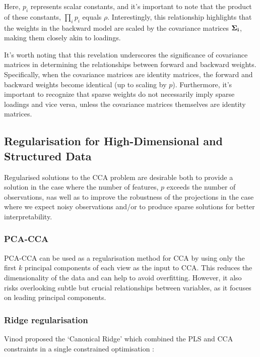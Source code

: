 Here, $p_i$ represents scalar constants, and it's important to note that the product of these constants, $\prod_i p_i$ equals $\rho$.
Interestingly, this relationship highlights that the weights in the backward model are scaled by the covariance matrices $\bold{\Sigma_i}$, making them closely akin to loadings.

It's worth noting that this revelation underscores the significance of covariance matrices in determining the relationships between forward and backward weights.
Specifically, when the covariance matrices are identity matrices, the forward and backward weights become identical (up to scaling by $p$).
Furthermore, it's important to recognize that sparse weights do not necessarily imply sparse loadings and vice versa, unless the covariance matrices themselves are identity matrices.

\subsection{Regularisation for High-Dimensional and Structured Data}

Regularised solutions to the CCA problem are desirable both to provide a solution in the case where the number of features, \( p \) exceeds the number of observations, \( n \)as well as to improve the robustness of the projections in the case where we expect noisy observations \cite{branco2005robust} and/or to produce sparse solutions for better interpretability\cite{parkhomenko2009sparse}.

\subsubsection{PCA-CCA}

PCA-CCA can be used as a regularisation method for CCA by using only the first \( k \) principal components of each
view as the input to CCA. This reduces the dimensionality of the data and can help to avoid overfitting. However, it
also risks overlooking subtle but crucial relationships between variables, as it focuses on leading principal components.

\subsubsection{Ridge regularisation}\label{subsec:ridge-regularisation}

Vinod proposed the `Canonical Ridge' which combined the PLS and CCA constraints in a single constrained optimisation \cite{vinod1976canonical}:

